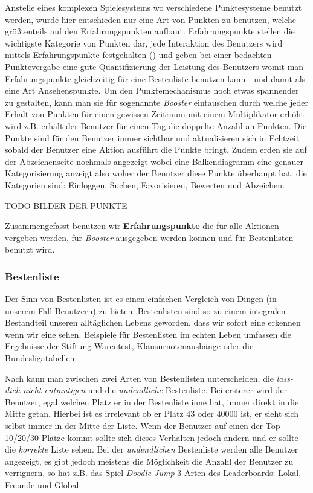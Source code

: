 \documentclass[12pt,twoside]{book}
\begin{document}
Anstelle eines komplexen Spielesystems wo verschiedene Punktesysteme benutzt werden, wurde hier entschieden nur eine Art von Punkten zu benutzen,
welche größtenteils auf den Erfahrungspunkten aufbaut. Erfahrungspunkte stellen die wichtigste Kategorie von Punkten dar, jede Interaktion des Benutzers wird mittels Erfahrungspunkte festgehalten (\citep{zichermann2011gamification}) und geben bei einer bedachten Punktevergabe  eine gute Quantifizierung der Leistung des Benutzers womit man Erfahrungspunkte gleichzeitig für eine Bestenliste benutzen kann - und damit als eine Art Ansehenspunkte. Um den Punktemechanismus noch etwas spannender zu gestalten, kann man sie für sogenannte \textit{Booster} eintauschen durch welche jeder Erhalt von Punkten für einen gewissen Zeitraum mit einem Multiplikator erhöht wird z.B. erhält der Benutzer für einen Tag die doppelte Anzahl an Punkten.
Die Punkte sind für den Benutzer immer sichtbar und aktualisieren sich in Echtzeit sobald der Benutzer eine Aktion ausführt die Punkte bringt. Zudem erden sie auf der Abzeichenseite nochmals angezeigt wobei eine Balkendiagramm eine genauer Kategorisierung anzeigt also woher der Benutzer diese Punkte überhaupt hat, die Kategorien sind: Einloggen, Suchen, Favorisieren, Bewerten und Abzeichen.

TODO BILDER DER PUNKTE

Zusammengefasst benutzen wir \textbf{Erfahrungspunkte} die für alle Aktionen vergeben werden, für \textit{Booster} ausgegeben werden können und für Bestenlisten benutzt wird.

\subsubsection{Bestenliste}

Der Sinn von Bestenlisten ist es einen einfachen Vergleich von Dingen (in unserem Fall Benutzern) zu bieten. Bestenlisten sind so zu einem integralen Bestandteil unseren alltäglichen Lebens geworden, dass wir sofort eine erkennen wenn wir eine sehen. Beispiele für Bestenlisten im echten Leben umfassen die Ergebnisse der Stiftung Warentest, Klausurnotenaushänge oder die Bundesligatabellen.

Nach \citep{zichermann2011gamification} kann man zwischen zwei Arten von Bestenlisten unterscheiden, die \textit{lass-dich-nicht-entmutigen} und die \textit{undendliche} Bestenliste. Bei ersterer wird der Benutzer, egal welchen Platz er in der Bestenliste inne hat, immer direkt in die Mitte getan. Hierbei ist es irrelevant ob er Platz 43 oder 40000 ist, er sieht sich selbst immer in der Mitte der Liste. Wenn der Benutzer auf einen der Top 10/20/30 Plätze kommt sollte sich dieses Verhalten jedoch ändern und er sollte die \textit{korrekte} Liste sehen.
Bei der \textit{undendlichen} Bestenliste werden alle Benutzer angezeigt, es gibt jedoch meistens die Möglichkeit die Anzahl der Benutzer zu verrignern, so hat z.B. das Spiel \textit{Doodle Jump} 3 Arten des Leaderboards: Lokal, Freunde und Global.
\end{document}
